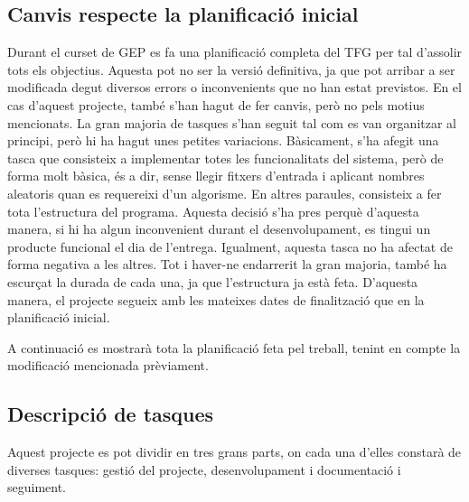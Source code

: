 \documentclass[a4paper]{article}
\begin{document}
\subsection{Canvis respecte la planificació inicial}

Durant el curset de GEP es fa una planificació completa del TFG per tal d'assolir tots els objectius. Aquesta pot no ser la versió definitiva, ja que pot arribar a ser modificada degut diversos errors o inconvenients que no han estat previstos. En el cas d'aquest projecte, també s'han hagut de fer canvis, però no pels motius mencionats. La gran majoria de tasques s'han seguit tal com es van organitzar al principi, però hi ha hagut unes petites variacions. Bàsicament, s'ha afegit una tasca que consisteix a implementar totes les funcionalitats del sistema, però de forma molt bàsica, és a dir, sense llegir fitxers d'entrada i aplicant nombres aleatoris quan es requereixi d'un algorisme. En altres paraules, consisteix a fer tota l'estructura del programa. Aquesta decisió s'ha pres perquè d'aquesta manera, si hi ha algun inconvenient durant el desenvolupament, es tingui un producte funcional el dia de l'entrega. Igualment, aquesta tasca no ha afectat de forma negativa a les altres. Tot i haver-ne endarrerit la gran majoria, també ha escurçat la durada de cada una, ja que l'estructura ja està feta. D'aquesta manera, el projecte segueix amb les mateixes dates de finalització que en la planificació inicial.

A continuació es mostrarà tota la planificació feta pel treball, tenint en compte la modificació mencionada prèviament.

\subsection{Descripció de tasques}
Aquest projecte es pot dividir en tres grans parts, on cada una d'elles constarà de diverses tasques: gestió del projecte, desenvolupament i documentació i seguiment.
\end{document}
